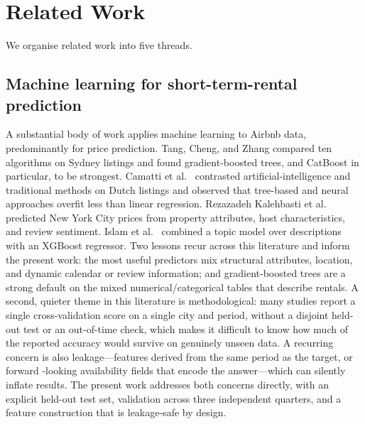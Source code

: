 \documentclass[journal]{IEEEtran}
\begin{document}
\section{Related Work}
\label{sec:related}
We organise related work into five threads.

\subsection{Machine learning for short-term-rental prediction}
A substantial body of work applies machine learning to Airbnb data, predominantly
for price prediction. Tang, Cheng, and Zhang \cite{tang2024} compared ten
algorithms on Sydney listings and found gradient-boosted trees, and CatBoost in
particular, to be strongest. Camatti et al.\ \cite{camatti2024} contrasted
artificial-intelligence and traditional methods on Dutch listings and observed
that tree-based and neural approaches overfit less than linear regression.
Rezazadeh Kalehbasti et al.\ \cite{kalehbasti2019} predicted New York City prices
from property attributes, host characteristics, and review sentiment. Islam et
al.\ \cite{islam2022} combined a topic model over descriptions with an XGBoost
regressor. Two lessons recur across this literature and inform the present work:
the most useful predictors mix structural attributes, location, and dynamic
calendar or review information; and gradient-boosted trees are a strong default on
the mixed numerical/categorical tables that describe rentals. A second, quieter
theme in this literature is methodological: many studies report a single
cross-validation score on a single city and period, without a disjoint held-out
test or an out-of-time check, which makes it difficult to know how much of the
reported accuracy would survive on genuinely unseen data. A recurring concern is
also leakage---features derived from the same period as the target, or forward
-looking availability fields that encode the answer---which can silently inflate
results. The present work addresses both concerns directly, with an explicit
held-out test set, validation across three independent quarters, and a feature
construction that is leakage-safe by design.
\end{document}
